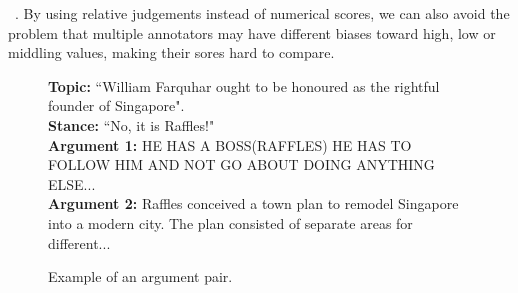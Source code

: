 ~\cite{kendall1948rank,kingsley2006preference}.
By using relative judgements instead of numerical scores, we can also avoid the problem that multiple annotators 
may have different biases toward high, low or middling values, making their sores hard to compare.
\begin{figure}
\textbf{Topic:} ``William Farquhar ought to be honoured as the rightful founder of Singapore". \\
\textbf{Stance:} ``No, it is Raffles!" \\
\textbf{Argument 1:}  
HE HAS A BOSS(RAFFLES) HE HAS TO FOLLOW HIM AND NOT GO ABOUT DOING ANYTHING ELSE... \\
\textbf{Argument 2:} 
Raffles conceived a town plan to remodel Singapore into a modern city. The plan consisted of separate areas for different...
\caption{Example of an argument pair.}
\label{fig:argument_examples}
\end{figure}

